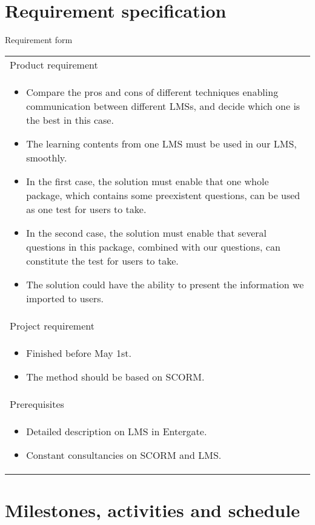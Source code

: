 \documentclass{report}
\begin{document}
\section{Requirement specification}
Requirement form \\
\begin{table}[h]
	\begin{tabular}{| p{15cm} |}
		\hline
		Product requirement \\
		\begin{itemize}
			\item
				Compare the pros and cons of different techniques enabling communication between different LMSs, and decide which one is the best in 
				this case.
			\item
				The learning contents from one LMS must be used in our LMS, smoothly.
			\item
				In the first case, the solution must enable that one whole package, which contains some preexistent questions, can be used as one test
				for users to take.
			\item
				In the second case, the solution must enable that several questions in this package, combined with our questions, can constitute the 
				test for users to take.
			\item
				The solution could have the ability to present the information we imported to users.
		\end{itemize}
		\\

		\hline
		Project requirement \\
		\begin{itemize}
			\item
				Finished before May 1st.
			\item
				The method should be based on SCORM.
		\end{itemize}
		\\
		\hline
		Prerequisites \\
		\begin{itemize}
			\item
				Detailed description on LMS in Entergate.
			\item
				Constant consultancies on SCORM and LMS.
		\end{itemize}
		\\
		\hline
	\end{tabular}
\end{table}

\section{Milestones, activities and schedule}
\end{document}
